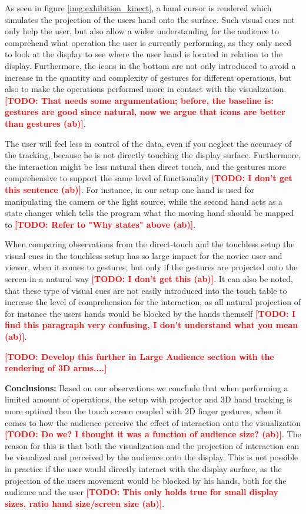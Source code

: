 \documentclass[review,journal]{vgtc}         %
\newcommand{\todo}[1]{\textbf{\textcolor{red}{[TODO: {#1}]}}}
\begin{document}
As seen in figure \ref{img:exhibition_kinect}, a hand cursor is rendered which simulates the projection of the users hand onto the surface. Such visual cues not only help the user, but also allow a wider understanding for the audience to comprehend what operation the user is currently performing, as they only need to look at the display to see where the user hand is located in relation to the display. Furthermore, the icons in the bottom are not only introduced to avoid a increase in the quantity and complexity of gestures for different operations, but also to make the operations performed more in contact with the visualization. \todo{That needs some argumentation; before, the baseline is: gestures are good since natural, now we argue that icons are better than gestures (ab)}.

The user will feel less in control of the data, even if you neglect the accuracy of the tracking, because he is not directly touching the display surface. Furthermore, the interaction might be less natural then direct touch, and the gestures more comprehensive to support the same level of functionality \todo{I don't get this sentence (ab)}. For instance, in our setup one hand is used for manipulating the camera or the light source, while the second hand acts as a state changer which tells the program what the moving hand should be mapped to \todo{Refer to "Why states" above (ab)}.

When comparing observations from the direct-touch and the touchless setup the visual cues in the touchless setup has so large impact for the novice user and viewer, when it comes to gestures, but only if the gestures are projected onto the screen in a natural way \todo{I don't get this (ab)}. It can also be noted, that these type of visual cues are not easily introduced into the touch table to increase the level of comprehension for the interaction, as all natural projection of for instance the users hands would be blocked by the hands themself \todo{I find this paragraph very confusing, I don't understand what you mean (ab)}.

\todo{Develop this further in Large Audience section with the rendering of 3D arms....}

\textbf{Conclusions:}
Based on our observations we conclude that when performing a limited amount of operations, the setup with projector and 3D hand tracking is more optimal then the touch screen coupled with 2D finger gestures, when it comes to how the audience perceive the effect of interaction onto the visualization \todo{Do we? I thought it was a function of audience size? (ab)}. The reason for this is that both the visualization and the projection of interaction can be visualized and perceived by the audience onto the display. This is not possible in practice if the user would directly interact with the display surface, as the projection of the users movement would be blocked by his hands, both for the audience and the user \todo{This only holds true for small display sizes, ratio hand size/screen size (ab)}.
\end{document}
